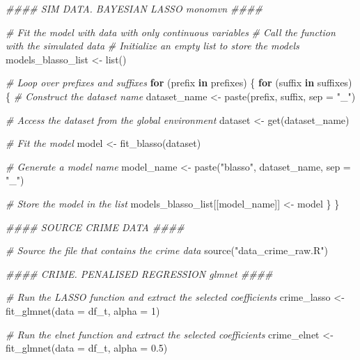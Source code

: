 \documentclass[
  11pt,
]{article}
\newenvironment{Shaded}{}{}
\newcommand{\AttributeTok}[1]{\textcolor[rgb]{0.49,0.56,0.16}{#1}}
\newcommand{\CommentTok}[1]{\textcolor[rgb]{0.38,0.63,0.69}{\textit{#1}}}
\newcommand{\ControlFlowTok}[1]{\textcolor[rgb]{0.00,0.44,0.13}{\textbf{#1}}}
\newcommand{\DecValTok}[1]{\textcolor[rgb]{0.25,0.63,0.44}{#1}}
\newcommand{\DocumentationTok}[1]{\textcolor[rgb]{0.73,0.13,0.13}{\textit{#1}}}
\newcommand{\FloatTok}[1]{\textcolor[rgb]{0.25,0.63,0.44}{#1}}
\newcommand{\FunctionTok}[1]{\textcolor[rgb]{0.02,0.16,0.49}{#1}}
\newcommand{\NormalTok}[1]{#1}
\newcommand{\OtherTok}[1]{\textcolor[rgb]{0.00,0.44,0.13}{#1}}
\newcommand{\StringTok}[1]{\textcolor[rgb]{0.25,0.44,0.63}{#1}}
\begin{document}
\begin{Shaded}
\begin{Highlighting}[]
\DocumentationTok{\#\#\#\# SIM DATA. BAYESIAN LASSO \textquotesingle{}monomvn\textquotesingle{} \#\#\#\#}

\CommentTok{\# Fit the model with data with only continuous variables}
\CommentTok{\# Call the function with the simulated data}
\CommentTok{\# Initialize an empty list to store the models}
\NormalTok{models\_blasso\_list }\OtherTok{\textless{}{-}} \FunctionTok{list}\NormalTok{()}

\CommentTok{\#   Loop over prefixes and suffixes}
\ControlFlowTok{for}\NormalTok{ (prefix }\ControlFlowTok{in}\NormalTok{ prefixes) \{}
  \ControlFlowTok{for}\NormalTok{ (suffix }\ControlFlowTok{in}\NormalTok{ suffixes) \{}
    \CommentTok{\# Construct the dataset name}
\NormalTok{    dataset\_name }\OtherTok{\textless{}{-}} \FunctionTok{paste}\NormalTok{(prefix, suffix, }\AttributeTok{sep =} \StringTok{"\_"}\NormalTok{)}
    
    \CommentTok{\# Access the dataset from the global environment}
\NormalTok{    dataset }\OtherTok{\textless{}{-}} \FunctionTok{get}\NormalTok{(dataset\_name)}
    
    \CommentTok{\# Fit the model}
\NormalTok{    model }\OtherTok{\textless{}{-}} \FunctionTok{fit\_blasso}\NormalTok{(dataset)}
    
    \CommentTok{\# Generate a model name}
\NormalTok{    model\_name }\OtherTok{\textless{}{-}} \FunctionTok{paste}\NormalTok{(}\StringTok{"blasso"}\NormalTok{, dataset\_name, }\AttributeTok{sep =} \StringTok{"\_"}\NormalTok{)}
    
    \CommentTok{\# Store the model in the list}
\NormalTok{    models\_blasso\_list[[model\_name]] }\OtherTok{\textless{}{-}}\NormalTok{ model}
\NormalTok{  \}}
\NormalTok{\}}

\DocumentationTok{\#\#\#\# SOURCE CRIME DATA \#\#\#\#}

\CommentTok{\# Source the file that contains the crime data}
\FunctionTok{source}\NormalTok{(}\StringTok{"data\_crime\_raw.R"}\NormalTok{)}

\DocumentationTok{\#\#\#\# CRIME. PENALISED REGRESSION \textquotesingle{}glmnet\textquotesingle{} \#\#\#\#}

\CommentTok{\# Run the LASSO function and extract the selected coefficients}
\NormalTok{crime\_lasso }\OtherTok{\textless{}{-}} \FunctionTok{fit\_glmnet}\NormalTok{(}\AttributeTok{data =}\NormalTok{ df\_t, }\AttributeTok{alpha =} \DecValTok{1}\NormalTok{)}

\CommentTok{\# Run the elnet function and extract the selected coefficients}
\NormalTok{crime\_elnet }\OtherTok{\textless{}{-}} \FunctionTok{fit\_glmnet}\NormalTok{(}\AttributeTok{data =}\NormalTok{ df\_t, }\AttributeTok{alpha =} \FloatTok{0.5}\NormalTok{)}


\end{Highlighting}
\end{Shaded}
\end{document}
